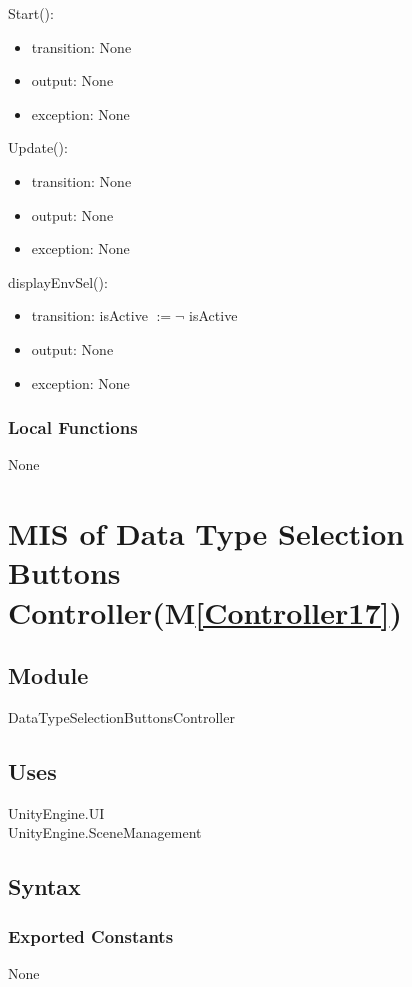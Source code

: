\documentclass[12pt, titlepage]{article}
\newcommand{\mref}[1]{M\ref{#1}}
\begin{document}
\noindent Start():
\begin{itemize}
\item transition: None
\item output: None
\item exception: None
\end{itemize}

\noindent Update():
\begin{itemize}
\item transition: None
\item output: None
\item exception: None
\end{itemize}

\noindent displayEnvSel():
\begin{itemize}
\item transition: isActive $\mathit{:= \neg}$ isActive
\item output: None
\item exception: None
\end{itemize}
\subsubsection{Local Functions}
None


\newpage

\section{MIS of Data Type Selection Buttons Controller(\mref{Controller17})}  

\subsection{Module}
DataTypeSelectionButtonsController

\subsection{Uses}
UnityEngine.UI\\
UnityEngine.SceneManagement\\

\subsection{Syntax}

\subsubsection{Exported Constants}
None
\end{document}
